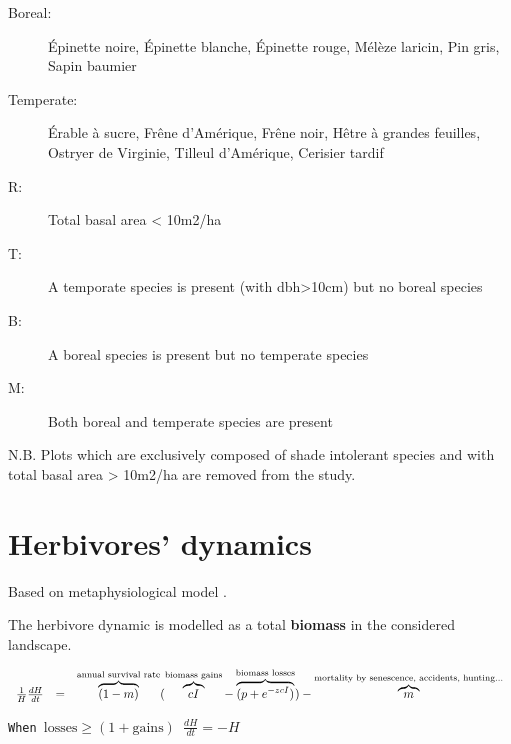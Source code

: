 \begin{description}
\item[Boreal: ] Épinette noire, Épinette blanche, Épinette rouge, Mélèze laricin, Pin gris, Sapin baumier
\item[Temperate: ] Érable à sucre, Frêne d'Amérique, Frêne noir, Hêtre à grandes feuilles, Ostryer de Virginie, Tilleul d'Amérique, Cerisier tardif
\end{description}

\begin{description}
\item[R:] Total basal area < 10m2/ha
\item[T:] A temporate species is present (with dbh>10cm) but no boreal species
\item[B:] A boreal species is present but no temperate species
\item[M:] Both boreal and temperate species are present
\end{description}

N.B. Plots which are exclusively composed of shade intolerant species and with total basal area > 10m2/ha are removed from the study.




\newpage
\section{Herbivores' dynamics}

Based on metaphysiological model \citep{Owen-Smith2002}.

The herbivore dynamic is modelled as a total \textbf{biomass} in the considered
landscape.

\[
\left.
\begin{array}{r c l}{}

\frac{1}{H}\frac{dH}{dt} &=& 
\overbrace{(1-m)}^\text{annual survival rate}
(\overbrace{cI}^\text{biomass gains} - \overbrace{(p+e^{-zcI})}^\text{biomass losses})
- \overbrace{m}^\text{mortality by senescence, accidents, hunting...}

\end{array}
\right.
\]

\texttt{When $\text{losses}\geq (1+\text{gains})$ $\frac{dH}{dt}=-H$}


